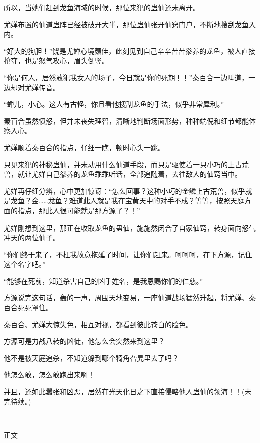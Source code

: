 \begin{this_body}
所以，当她们赶到龙鱼海域的时候，那位来犯的蛊仙还未离开。

尤婵布置的仙道蛊阵已经被破开大半，那位蛊仙张开仙窍门户，不断地搜刮龙鱼入内。

“好大的狗胆！”饶是尤婵心境颇佳，此刻见到自己辛辛苦苦豢养的龙鱼，被人直接抢夺，也是怒气攻心，眉头倒竖。

“你是何人，居然敢犯我女人的场子，今日就是你的死期！！”秦百合一边叫道，一边却对尤婵传音。

“蝉儿，小心。这人有古怪，你且看他搜刮龙鱼的手法，似乎非常犀利。”

秦百合虽然愤怒，但并未丧失理智，清晰地判断场面形势，种种端倪和细节都能体察入心。

尤婵顺着秦百合的指点，仔细一瞧，顿时心头一跳。

只见来犯的神秘蛊仙，并未动用什么仙道手段，而只是驱使着一只小巧的上古荒兽，就让尤婵自己豢养的龙鱼乖乖听话，全部追随着，去往敌人的仙窍当中。

尤婵再仔细分辨，心中更加惊讶：“怎么回事？这种小巧的金鳞上古荒兽，似乎就是龙鱼？金……龙鱼？难道此人就是我在宝黄天中的对手不成？等等，按照天庭方面的指点，那此人很可能就是那方源了？！”

尤婵刚想到这里，那正在收取龙鱼的蛊仙，施施然闭合了自家仙窍，转身面向怒气冲天的两位仙子。

“你们终于来了，不枉我故意拖延了时间，让你们赶来。呵呵呵，在下方源，记住这个名字吧。”

“能够在死前，知道杀害自己的凶手姓名，是我恩赐你们的仁慈。”

方源说完这句话，轰的一声，周围天地变易，一座仙道战场猛然升起，将尤婵、秦百合死死罩住。

秦百合、尤婵大惊失色，相互对视，都看到彼此苍白的脸色。

方源可是力战八转的凶徒，他怎么会突然来到这里？

他不是被天庭追杀，不知道躲到哪个犄角旮旯里去了吗？

他怎么敢，怎么敢跑出来啊！

并且，还如此嚣张和凶恶，居然在光天化日之下直接侵略他人蛊仙的领海！！(未完待续。)

------------

正文

\end{this_body}

